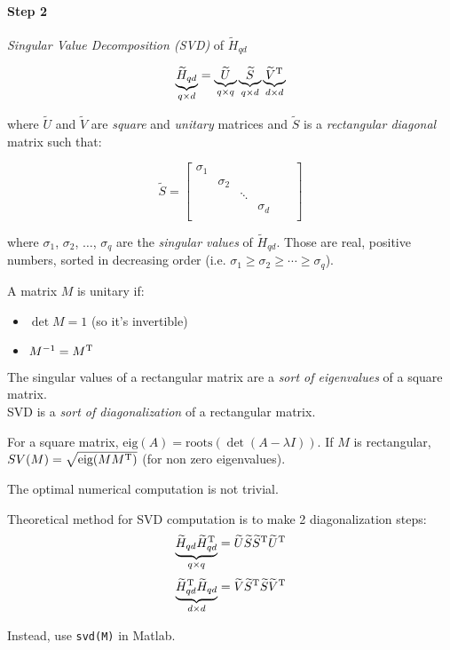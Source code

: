 \paragraph{Step 2} \emph{Singular Value Decomposition (SVD)} of $\tilde{H}_{qd}$

\[
    \underbrace{\widetilde{H}_{qd}}_{q\times d} = \underbrace{\widetilde{U}}_{q\times q} \underbrace{\widetilde{S}}_{q\times d} \underbrace{\widetilde{V}^{\mathrm{T}}}_{d\times d}
\]

where $\tilde{U}$ and $\tilde{V}$ are \emph{square} and \emph{unitary} matrices and $\tilde{S}$ is a \emph{rectangular diagonal} matrix such that:

\[
    \tilde{S} = \begin{bmatrix}
        \sigma_1 & & & & &\\
        & \sigma_2 & & & &\\
        & & \ddots & & &\\
        & & & \sigma_d & &\\
    \end{bmatrix}
\]

where $\sigma_1$, $\sigma_2$, $\ldots$, $\sigma_q$ are the \emph{singular values} of $\tilde{H}_{qd}$.
Those are real, positive numbers, sorted in decreasing order (i.e. $\sigma_1 \ge \sigma_2 \ge \cdots \ge \sigma_q$).

\begin{definition}
    A matrix $M$ is unitary if:
    \begin{itemize}
        \item $\det M = 1$ (so it's invertible)
        \item $M^{-1} = M^{\mathrm{T}}$
    \end{itemize}
\end{definition}

\begin{obs}
    The singular values of a rectangular matrix are a \emph{sort of eigenvalues} of a square matrix.\\
    SVD is a \emph{sort of diagonalization} of a rectangular matrix.
\end{obs}

\begin{remark}
    For a square matrix, $\text{eig}(A) = \text{roots}(\det(A-\lambda I))$. If $M$ is rectangular, $SV(M) = \sqrt{\text{eig}(MM^{\mathrm{T}})}$ (for non zero eigenvalues).
\end{remark}

\begin{remark}
    The optimal numerical computation is not trivial. 

    Theoretical method for SVD computation is to make 2 diagonalization steps:
    \[
        \underbrace{\widetilde{H}_{qd} \widetilde{H}_{qd}^{\mathrm{T}}}_{q\times q} = \widetilde{U}\widetilde{S}\widetilde{S}^{\mathrm{T}}\widetilde{U}^{\mathrm{T}}
    \]
    \[
        \underbrace{\widetilde{H}_{qd}^{\mathrm{T}} \widetilde{H}_{qd}}_{d\times d} = \widetilde{V}\widetilde{S}^{\mathrm{T}}\widetilde{S}\widetilde{V}^{\mathrm{T}}
    \]
    
    Instead, use \texttt{svd(M)} in Matlab.
\end{remark}

